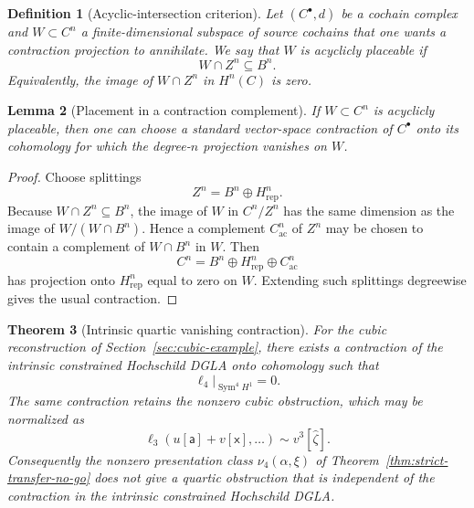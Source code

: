 \documentclass[11pt]{amsart}
\newtheorem{theorem}{Theorem}[section]
\newtheorem{lemma}[theorem]{Lemma}
\newtheorem{definition}[theorem]{Definition}
\begin{document}
\begin{definition}[Acyclic-intersection criterion]\label{def:acyclic-intersection}
Let $(C^\bullet,d)$ be a cochain complex and $W\subset C^n$ a finite-dimensional subspace of source cochains that one wants a contraction projection to annihilate.  We say that $W$ is \emph{acyclicly placeable} if
\[
W\cap Z^n\subseteq B^n.
\]
Equivalently, the image of $W\cap Z^n$ in $H^n(C)$ is zero.
\end{definition}

\begin{lemma}[Placement in a contraction complement]\label{lem:acyclic-placement}
If $W\subset C^n$ is acyclicly placeable, then one can choose a standard vector-space contraction of $C^\bullet$ onto its cohomology for which the degree-$n$ projection vanishes on $W$.
\end{lemma}

\begin{proof}
Choose splittings
\[
Z^n=B^n\oplus H^n_{\mathrm{rep}}.
\]
Because $W\cap Z^n\subseteq B^n$, the image of $W$ in $C^n/Z^n$ has the same dimension as the image of $W/(W\cap B^n)$.  Hence a complement $C^n_{\mathrm{ac}}$ of $Z^n$ may be chosen to contain a complement of $W\cap B^n$ in $W$.  Then
\[
C^n=B^n\oplus H^n_{\mathrm{rep}}\oplus C^n_{\mathrm{ac}}
\]
has projection onto $H^n_{\mathrm{rep}}$ equal to zero on $W$.  Extending such splittings degreewise gives the usual contraction.
\end{proof}

\begin{theorem}[Intrinsic quartic vanishing contraction]\label{thm:intrinsic-ell4-vanish}
For the cubic reconstruction of Section~\ref{sec:cubic-example}, there exists a contraction of the intrinsic constrained Hochschild DGLA onto cohomology such that
\[
\boxed{
\ell_4\big|_{\operatorname{Sym}^4H^1}=0.
}
\]
The same contraction retains the nonzero cubic obstruction, which may be normalized as
\[
\ell_3(u[\mathsf a]+v[\mathsf x],\ldots)
\sim v^3[\widehat\zeta].
\]
Consequently the nonzero presentation class $\nu_4(\alpha,\xi)$ of
Theorem~\ref{thm:strict-transfer-no-go} does not give a quartic obstruction that is
independent of the contraction in the intrinsic constrained Hochschild DGLA.
\end{theorem}
\end{document}

